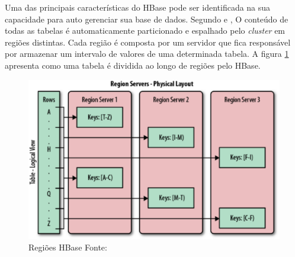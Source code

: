 Uma das principais características do HBase pode ser identificada na sua capacidade para auto gerenciar sua base de dados. Segundo  e , O conteúdo de todas as tabelas é automaticamente particionado e espalhado pelo \textit{cluster} em regiões distintas. Cada região é composta por um servidor que fica responsável por armazenar um intervalo de valores de uma determinada tabela. A figura \ref{fig-hbase-region} apresenta como uma tabela é dividida ao longo de regiões pelo HBase.

\begin{figure}[ht!]
	\centering
	\includegraphics[keepaspectratio=true,scale=0.5]
	  {figuras/hbase-region.eps}
	\caption[Regiões HBase]{Regiões HBase
	\protect\linebreak Fonte: \cite{george2011}}
	\label{fig-hbase-region}
\end{figure}
\FloatBarrier

